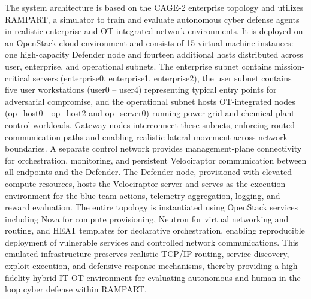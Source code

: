 The system architecture is based on the CAGE-2 enterprise topology \cite{kiely2023autonomous} and utilizes RAMPART, a simulator to train and evaluate autonomous cyber defense agents in realistic enterprise and OT-integrated network environments.
It is deployed on an OpenStack cloud environment and consists of 15 virtual machine instances: one high-capacity Defender node and fourteen additional hosts distributed across user, enterprise, and operational subnets. 
The enterprise subnet contains mission-critical servers (enterprise0, enterprise1, enterprise2), the user subnet contains five user workstations (user0 – user4) representing typical entry points for adversarial compromise, and the operational subnet hosts OT-integrated nodes (op\_host0 - op\_host2 and op\_server0) running power grid and chemical plant control workloads. Gateway nodes interconnect these subnets, enforcing routed communication paths and enabling realistic lateral movement across network boundaries. 
A separate control network provides management-plane connectivity for orchestration, monitoring, and persistent Velociraptor communication between all endpoints and the Defender. 
The Defender node, provisioned with elevated compute resources, hosts the Velociraptor server and serves as the execution environment for the blue team actions, telemetry aggregation, logging, and reward evaluation. 
The entire topology is instantiated using OpenStack services including Nova for compute provisioning, Neutron for virtual networking and routing, and HEAT templates for declarative orchestration, enabling reproducible deployment of vulnerable services and controlled network communications. 
This emulated infrastructure preserves realistic TCP/IP routing, service discovery, exploit execution, and defensive response mechanisms, thereby providing a high-fidelity hybrid IT-OT environment for evaluating autonomous and human-in-the-loop cyber defense within RAMPART.